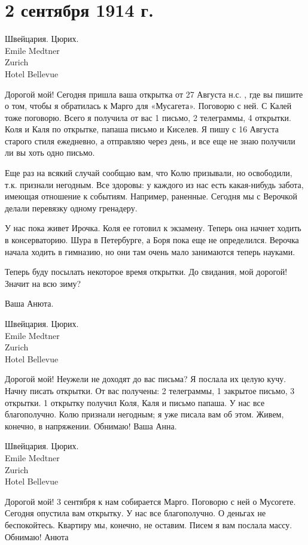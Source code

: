 \section{2 сентября 1914 г.}


Швейцария. Цюрих. \\
Emile Medtner \\
Zurich \\
Hotel Bellevue


Дорогой мой! Сегодня пришла ваша открытка от 27 Августа н.с. , где вы пишите о том, чтобы я обратилась к Марго для «Мусагета».
Поговорю с ней. С Калей тоже поговорю. Всего я получила от вас 1 письмо, 2
телеграммы, 4 открытки. Коля и Каля по открытке, папаша письмо и Киселев. Я
пишу с 16 Августа старого стиля ежедневно, а отправляю через день, и все еще не
знаю получили ли вы хоть одно письмо.

Еще раз на всякий случай сообщаю вам, что Колю призывали, но освободили, т.к.
признали негодным. Все здоровы: у каждого из нас есть какая-нибудь забота,
имеющая отношение к событиям. Например, раненные. Сегодня мы с Верочкой делали
перевязку одному гренадеру.

У нас пока живет Ирочка. Коля ее готовил к экзамену. Теперь она начнет ходить в
консерваторию. Шура в Петербурге, а Боря пока еще не определился. Верочка
начала ходить в гимназию, но они там очень мало занимаются теперь науками.

Теперь буду посылать некоторое время открытки. До свидания, мой дорогой! Значит
на всю зиму?

Ваша Анюта.


Швейцария. Цюрих. \\
Emile Medtner \\
Zurich \\
Hotel Bellevue


Дорогой мой! Неужели не доходят до вас письма? Я послала их целую кучу. Начну
писать открытки. От вас получены: 2 телеграммы, 1 закрытое письмо, 3 открытки.
1 открытку получил Коля, Каля и письмо папаша. У нас все благополучно. Колю
признали негодным; я уже писала вам об этом. Живем, конечно, в напряжении.
Обнимаю! Ваша Анна.


Швейцария. Цюрих. \\
Emile Medtner \\
Zurich \\
Hotel Bellevue


Дорогой мой! 3 сентября к нам собирается Марго. Поговорю с ней о Мусогете.
Сегодня опустила вам открытку. У нас все благополучно. О деньгах не
беспокойтесь. Квартиру мы, конечно, не оставим. Писем я вам послала массу.
Обнимаю! Анюта
